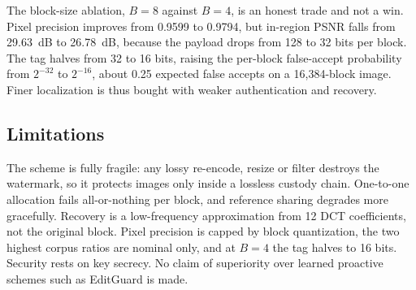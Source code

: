 The block-size ablation, $B=8$ against $B=4$, is an honest trade and not a win. Pixel precision improves from 0.9599 to 0.9794, but in-region PSNR falls from 29.63~dB to 26.78~dB, because the payload drops from 128 to 32 bits per block. The tag halves from 32 to 16 bits, raising the per-block false-accept probability from $2^{-32}$ to $2^{-16}$, about 0.25 expected false accepts on a 16,384-block image. Finer localization is thus bought with weaker authentication and recovery.

\subsection{Limitations}
The scheme is fully fragile: any lossy re-encode, resize or filter destroys the watermark, so it protects images only inside a lossless custody chain. One-to-one allocation fails all-or-nothing per block, and reference sharing degrades more gracefully. Recovery is a low-frequency approximation from 12 DCT coefficients, not the original block. Pixel precision is capped by block quantization, the two highest corpus ratios are nominal only, and at $B=4$ the tag halves to 16 bits. Security rests on key secrecy. No claim of superiority over learned proactive schemes such as EditGuard \cite{editguard} is made.
